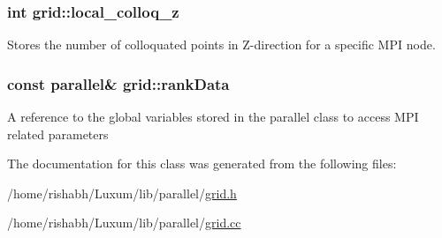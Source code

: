 \subsubsection[{\texorpdfstring{local\+\_\+colloq\+\_\+z}{local_colloq_z}}]{\setlength{\rightskip}{0pt plus 5cm}int grid\+::local\+\_\+colloq\+\_\+z}\hypertarget{classgrid_af91a948b95d0a97f7a75551f9500c38e}{}\label{classgrid_af91a948b95d0a97f7a75551f9500c38e}
Stores the number of colloquated points in Z-\/direction for a specific M\+PI node. 
\subsubsection[{\texorpdfstring{rank\+Data}{rankData}}]{\setlength{\rightskip}{0pt plus 5cm}const {\bf parallel}\& grid\+::rank\+Data}\hypertarget{classgrid_a601c3c843a2152673af275a88a140c5f}{}\label{classgrid_a601c3c843a2152673af275a88a140c5f}
A reference to the global variables stored in the parallel class to access M\+PI related parameters 

The documentation for this class was generated from the following files\+:\begin{DoxyCompactItemize}
\item 
/home/rishabh/\+Luxum/lib/parallel/\hyperlink{grid_8h}{grid.\+h}\item 
/home/rishabh/\+Luxum/lib/parallel/\hyperlink{grid_8cc}{grid.\+cc}\end{DoxyCompactItemize}
